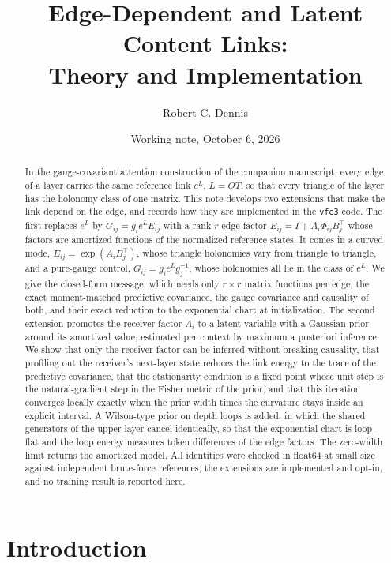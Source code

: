 \documentclass[11pt]{article}
\title{Edge-Dependent and Latent Content Links:\\Theory and Implementation}
\author{Robert C. Dennis}
\date{Working note, October 6, 2026}
\theoremstyle{definition}
\theoremstyle{remark}
\begin{document}
\maketitle

\begin{abstract}
In the gauge-covariant attention construction of the companion manuscript, every edge of a layer carries the same reference link $e^{L}$, $L=OT$, so that every triangle of the layer has the holonomy class of one matrix. This note develops two extensions that make the link depend on the edge, and records how they are implemented in the \texttt{vfe3} code. The first replaces $e^{L}$ by $G_{ij}=g_ie^{L}E_{ij}$ with a rank-$r$ edge factor $E_{ij}=I+A_i\Phi_{ij}B_j^\top$ whose factors are amortized functions of the normalized reference states. It comes in a curved mode, $E_{ij}=\exp(A_iB_j^\top)$, whose triangle holonomies vary from triangle to triangle, and a pure-gauge control, $G_{ij}=g_ie^{L}g_j^{-1}$, whose holonomies all lie in the class of $e^{L}$. We give the closed-form message, which needs only $r\times r$ matrix functions per edge, the exact moment-matched predictive covariance, the gauge covariance and causality of both, and their exact reduction to the exponential chart at initialization. The second extension promotes the receiver factor $A_i$ to a latent variable with a Gaussian prior around its amortized value, estimated per context by maximum a posteriori inference. We show that only the receiver factor can be inferred without breaking causality, that profiling out the receiver's next-layer state reduces the link energy to the trace of the predictive covariance, that the stationarity condition is a fixed point whose unit step is the natural-gradient step in the Fisher metric of the prior, and that this iteration converges locally exactly when the prior width times the curvature stays inside an explicit interval. A Wilson-type prior on depth loops is added, in which the shared generators of the upper layer cancel identically, so that the exponential chart is loop-flat and the loop energy measures token differences of the edge factors. The zero-width limit returns the amortized model. All identities were checked in float64 at small size against independent brute-force references; the extensions are implemented and opt-in, and no training result is reported here.
\end{abstract}

\section{Introduction}
\label{sec:intro}
\end{document}
